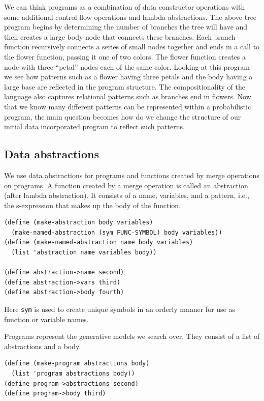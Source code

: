 \documentclass[a4paper,10pt]{article}
\begin{document}
We can think programs as a combination of data constructor operations with some additional control flow operations and lambda abstractions.  The above tree program begins by determining the number of branches the tree will have and then creates a large body node that connects these branches.  Each branch function recursively connects a series of small nodes together and ends in a call to the flower function, passing it one of two colors.  The flower function creates a node with three ``petal'' nodes each of the same color.  Looking at this program we see how patterns such as a flower having three petals and the body having a large base are reflected in the program structure.  The compositionality of the language also captures relational patterns such as branches end in flowers.  Now that we know many different patterns can be represented within a probabilistic program, the main question becomes how do we change the structure of our initial data incorporated program to reflect such patterns.

\subsection{Data abstractions}
We use data abstractions for programs and functions created by merge operations on programs.  A function created by a merge operation is called an abstraction (after lambda abstraction).  It consists of a name, variables, and a pattern, i.e., the s-expression that makes up the body of the function.  
\begin{lstlisting}[frame=trBL]
(define (make-abstraction body variables)
  (make-named-abstraction (sym FUNC-SYMBOL) body variables))
(define (make-named-abstraction name body variables)
  (list 'abstraction name variables body))

(define abstraction->name second)
(define abstraction->vars third)
(define abstraction->body fourth)
\end{lstlisting}
Here \texttt{sym} is used to create unique symbols in an orderly manner for use as function or variable names.


Programs represent the generative models we search over.  They consist of a list of abstractions and a body.
\begin{lstlisting}[frame=trBL]
(define (make-program abstractions body)
  (list 'program abstractions body))
(define program->abstractions second)
(define program->body third)
\end{lstlisting}  
\end{document}
